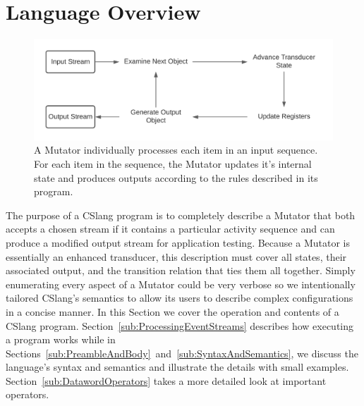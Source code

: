 \section{Language Overview}
\label{sec:Overview}

\begin{figure}
  \includegraphics[scale=.8]{images/processing}
  \caption{A Mutator individually processes each item in an input
  sequence.  For each item in the sequence, the Mutator updates it's
  internal state and produces outputs according to the rules described in
  its program.}
  \label{fig:Processing}
\end{figure}


The purpose
of a CSlang program is to completely describe a Mutator
that both
accepts a chosen stream if it contains a particular
activity sequence and can produce a modified
output stream
for application testing.
Because a Mutator is essentially an enhanced transducer,
this description must cover all states,
their associated output,
and the transition
relation that ties them all together.
Simply enumerating every aspect of a Mutator could be very verbose
so we intentionally tailored CSlang's semantics to allow its users to
describe complex configurations in a concise manner.
In this Section we cover the operation and contents of a CSlang program.
Section~\ref{sub:ProcessingEventStreams} describes how executing a program works
while
in Sections~\ref{sub:PreambleAndBody}~and~\ref{sub:SyntaxAndSemantics},
we discuss the
language's syntax and semantics and illustrate the details
with small examples.  Section~\ref{sub:DatawordOperators} takes a more
detailed look at important operators.


